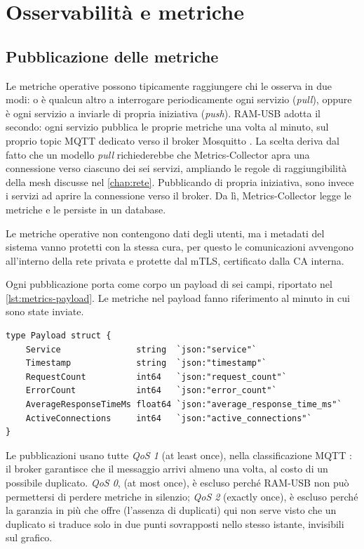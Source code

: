 \chapter{Osservabilità e metriche}
\label{chap:osservabilita}

\section{Pubblicazione delle metriche}

Le metriche operative possono tipicamente raggiungere chi le osserva in due modi: o è qualcun altro a 
interrogare periodicamente ogni servizio (\emph{pull}), oppure è ogni servizio a inviarle di propria 
iniziativa (\emph{push}). 
RAM-USB adotta il secondo: ogni servizio pubblica le proprie metriche una volta al minuto,
sul proprio topic MQTT dedicato verso il broker Mosquitto \cite{mosquitto-github}. 
La scelta deriva dal fatto che un modello \emph{pull} richiederebbe che Metrics-Collector apra una 
connessione verso ciascuno dei sei servizi, ampliando le regole di raggiungibilità della mesh discusse nel
\autoref{chap:rete}.
Pubblicando di propria iniziativa, sono invece i servizi ad aprire la connessione verso il broker.
Da lì, Metrics-Collector legge le metriche e le persiste in un database.

Le metriche operative non contengono dati degli utenti, ma i metadati del sistema vanno protetti con la 
stessa cura, per questo le comunicazioni avvengono all'interno della rete privata e protette dal mTLS, 
certificato dalla CA interna.

Ogni pubblicazione porta come corpo un payload di sei campi, riportato nel \autoref{lst:metrics-payload}.
Le metriche nel payload fanno riferimento al minuto in cui sono state inviate.

\begin{lstlisting}[caption={Struttura del payload delle metriche, da \texttt{payload.go}
\cite{ramusb-code-metrics-payload}.}, label={lst:metrics-payload}]
type Payload struct {
	Service               string  `json:"service"`
	Timestamp             string  `json:"timestamp"`
	RequestCount          int64   `json:"request_count"`
	ErrorCount            int64   `json:"error_count"`
	AverageResponseTimeMs float64 `json:"average_response_time_ms"` 
	ActiveConnections     int64   `json:"active_connections"`
}
\end{lstlisting}

Le pubblicazioni usano tutte \emph{QoS 1} (at least once), nella classificazione MQTT \cite{oasis-mqtt-311}: il
broker garantisce che il messaggio arrivi almeno una volta, al costo di un possibile duplicato. \emph{QoS 0},
(at most once), è escluso perché RAM-USB non può permettersi di perdere metriche in silenzio; \emph{QoS 2}
(exactly once), è escluso perché la garanzia in più che offre (l'assenza di duplicati) qui non serve
visto che un duplicato si traduce solo in due punti sovrapposti nello stesso istante, invisibili sul
grafico.

